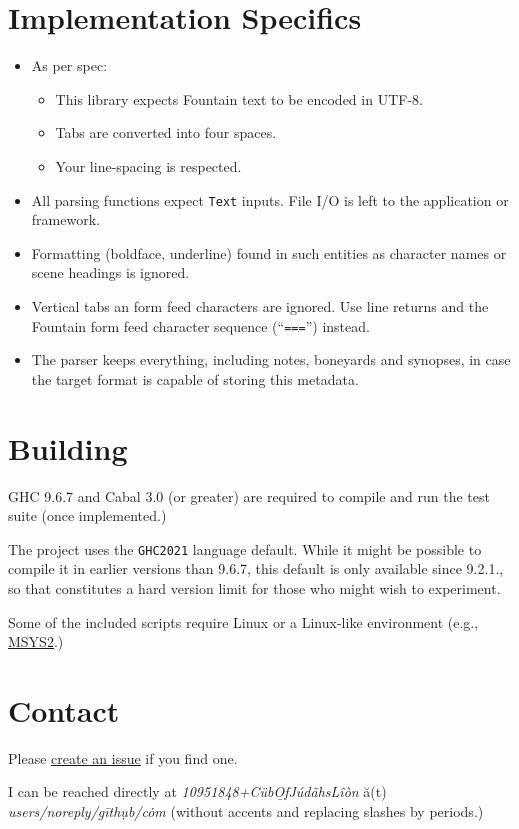 \documentclass[11pt]{article}
\newcommand{\link}[2]{\underline{\color{darkblue}\href{#1}{#2}}}
\begin{document}
\section*{Implementation Specifics}
\begin{itemize}
  \item As per spec:
    \begin{itemize}
      \item This library expects Fountain text to be
        encoded in \textrm{UTF-8}.
      \item Tabs are converted into four spaces.
      \item Your line-spacing is respected.
    \end{itemize}
  \item All parsing functions expect \texttt{Text} inputs. File
    I/O is left to the application or framework.
  \item Formatting (boldface, underline) found in such entities
    as character names or scene headings is ignored.
  \item Vertical tabs an form feed characters are ignored. Use
    line returns and the Fountain form feed character sequence
    (``\texttt{===}'') instead.
  \item The parser keeps everything, including notes, boneyards
    and synopses, in case the target format is capable of
    storing this metadata.
\end{itemize}

\section*{Building}
\textrm{GHC} 9.6.7 and \textrm{Cabal} 3.0 (or greater) are
required to compile and run the test suite (once implemented.)

The project uses the \texttt{GHC2021} language default. While
it might be possible to compile it in earlier versions than
9.6.7, this default is only available since 9.2.1., so that
constitutes a hard version limit for those who might wish to
experiment.

Some of the included scripts require Linux or a Linux-like
environment (e.g.,
\link{https://www.msys2.org/}{\textrm{MSYS2}}.)

\section*{Contact}
Please
\link{https://github.com/CubOfJudahsLion/fountain-parser/issues}{create an issue}
if you find one.

I can be reached directly at
\emph{\textrm{10951848+C\"{u}b\b{O}fJ\'{u}d\~{a}hsL\^{i}\`{o}n}}
\u{a}(t) \emph{\textrm{users/noreply/g\={i}th\d{u}b/c\.{o}m}}
(without accents and replacing slashes by periods.)
\end{document}
